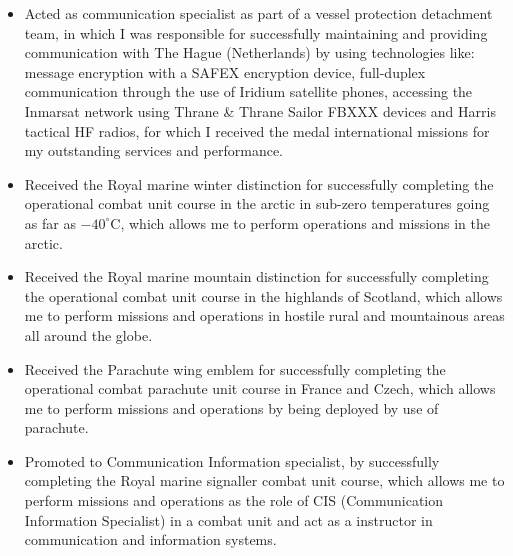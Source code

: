 {{{  \SmallSep

  \begin{itemize}
    \item Acted as communication specialist as part of a vessel protection
      detachment team, in which I was responsible for successfully maintaining
      and providing communication with The Hague (Netherlands) by using
      technologies like: message encryption with a SAFEX encryption device,
      full-duplex communication through the use of Iridium satellite phones,
      accessing the Inmarsat network using Thrane \& Thrane Sailor FBXXX
      devices and Harris tactical HF radios, for which I received the medal
      international missions for my outstanding services and performance.
    \item Received the Royal marine winter distinction for successfully
      completing the operational combat unit course in the arctic in sub-zero
      temperatures going as far as $-40^\circ$C, which allows me to perform
      operations and missions in the arctic.
    \item Received the Royal marine mountain distinction for successfully
      completing the operational combat unit course in the highlands of
      Scotland, which allows me to perform missions and operations in hostile
      rural and mountainous areas all around the globe.
    \item Received the Parachute wing emblem for successfully completing the
      operational combat parachute unit course in France and Czech, which
      allows me to perform missions and operations by being deployed by use
      of parachute.
    \item Promoted to Communication Information specialist, by successfully
      completing the Royal marine signaller combat unit course, which allows me
      to perform missions and operations as the role of CIS (Communication
      Information Specialist) in a combat unit and act as a instructor in
      communication and information systems.
  \end{itemize}
}

\SmallSep


\Sep


~\CVSection{\raisebox{.2em}{Software Development}}

}}
